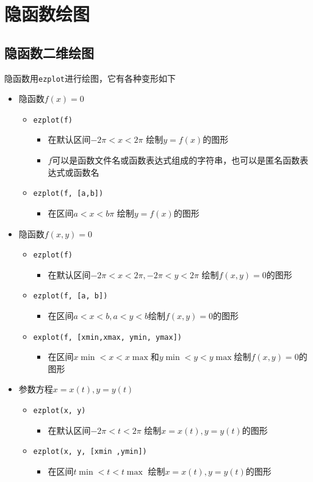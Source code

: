 \section{隐函数绘图}
\subsection{隐函数二维绘图}

\noindent 隐函数用\lstinline|ezplot|进行绘图，它有各种变形如下
\begin{itemize}
	\item 隐函数$f(x)=0$
	\vspace*{-1em}
	\begin{itemize}
		\item \lstinline|ezplot(f)| 
		\begin{itemize}
			\item 在默认区间$-2 \pi < x <2\pi$ 绘制$y = f(x)$的图形
			\item $f$可以是函数文件名或函数表达式组成的字符串，也可以是匿名函数表达式或函数名
		\end{itemize}
		\item \lstinline|ezplot(f, [a,b])|
		\begin{itemize}
			\item 在区间$a < x <b\pi$ 绘制$y = f(x)$的图形
		\end{itemize}
	\end{itemize}
	\item 隐函数$f(x,y) = 0$
	\begin{itemize}
		\item \lstinline|ezplot(f)|
		\begin{itemize}
			\item 在默认区间$-2\pi < x < 2\pi, -2 \pi < y < 2 \pi$ 绘制$f(x,y)= 0$的图形
		\end{itemize}
		\item \lstinline|ezplot(f, [a, b])|
		\begin{itemize}
			\item 在区间$a< x < b, a < y < b$绘制$f(x,y) = 0$的图形
		\end{itemize}
		\item \lstinline|explot(f, [xmin,xmax, ymin, ymax])| 
		\begin{itemize}
			\item 在区间$x\min < x < x\max$和$y\min < y < y\max$绘制$f(x,y) = 0$的图形
		\end{itemize}
	\end{itemize}
	\item 参数方程$x=x(t), y = y(t)$
	\begin{itemize}
		\item \lstinline|ezplot(x, y)|
		\begin{itemize}
			\item 在默认区间$-2 \pi < t <2\pi$ 绘制$x = x(t), y = y(t)$的图形
		\end{itemize}
		\item \lstinline|ezplot(x, y, [xmin ,ymin])|
		\begin{itemize}
			\item 在区间$t\min < t < t\max$ 绘制$x = x(t), y = y(t)$的图形
		\end{itemize}
	\end{itemize}
\end{itemize}
